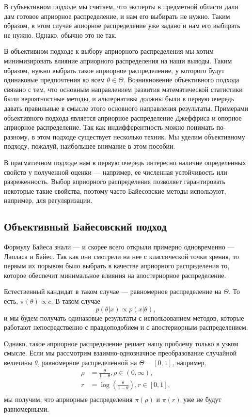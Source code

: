 В субъективном подходе мы считаем, что эксперты в предметной области дали дам готовое априорное распределение, и нам его выбирать не нужно.
Таким образом, в этом случае апиорное распределение уже задано и нам его выбирать не нужно.
Однако, обычно это не так.

В объективном подходе к выбору априорного распределения мы хотим минимизировать влияние априорного распределения
на наши выводы.
Таким образом, нужно выбрать такое априорное распределение, у которого будут одинаковые предпочтения ко всем $\theta \in \Theta$.
Возникновение объективного подхода связано с тем, что основным направлением развития математической статистики 
были вероятностные методы, и альтернативы должны были в первую очередь давать правильные в смысле этого основного направления результаты.
Примерами объективного подхода является априорное распределение Джеффриса и опорное априорное распределение.
Так как индифферентность можно понимать по-разному, в этом подходе существует несколько техник.
Мы уделим объективному подходу, пожалуй, наибольшее внимание в этом пособии.

В прагматичном подходе нам в первую очередь интересно наличие определенных свойств у полученной оценки --- 
например, ее численная устойчивость или разреженность.
Выбор априорного распределения позволяет гарантировать некоторые такие свойства,
поэтому часто Байесовские методы используют, например, для регуляризации.

\subsection{Объективный Байесовский подход}
\label{sec:objective_intro}

Формулу Байеса знали --- и скорее всего открыли примерно одновременно --- Лапласа и Байес. 
Так как они смотрели на нее с классической точки зрения,
то первым их порывом было выбрать в качестве априорного распределения то, 
которое обеспечит минимальное влияния на апостериорное распределение.

Естественный кандидат в таком случае --- равномерное распределение на $\Theta$.
То есть, $\pi(\theta) \propto c$.
В таком случае 
\[
p(\theta | x) \propto p(x | \theta),
\]
и мы будем получать одинаковые результаты с использованием методов, которые работают непосредственно с правдоподобием и с апостериорным распределением.

Однако, такое априорное распределение решает нашу проблему только в узком смысле.
Если мы рассмотрим взаимно-однозначное преобразование случайной величины $\theta$, равномерное распределенной на $\Theta = [0, 1]$, например,
\begin{align*}
\rho &= \frac{\theta}{1 - \theta}, \rho \in (0, \infty), \\
   r &= \log \left( \frac{\theta}{1 - \theta} \right), r \in [0, 1], \\
\end{align*}
мы получим, что априорные распределения $\pi(\rho)$ и $\pi(r)$ уже не будут равномерными.

